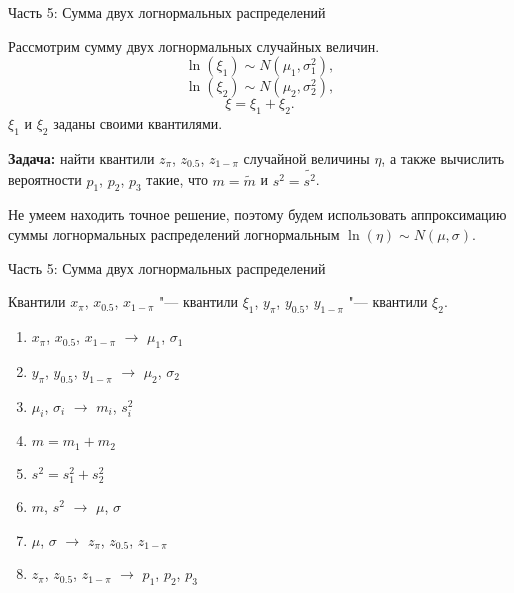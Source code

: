 \documentclass[ucs, notheorems, handout]{beamer}
\newenvironment{pr1}{\par\noindent{\bf Дано:}}{}
\begin{document}
\begin{frame}{Часть 5: Сумма двух логнормальных распределений }
	
		Рассмотрим сумму двух логнормальных случайных величин.
	\begin{equation*}
		\ln(\xi_{1}) \sim N(\mu_{1}, \sigma _{1}^{2}),
	\end{equation*}
	\begin{equation*}
		\ln(\xi_{2}) \sim N(\mu_{2}, \sigma _{2}^{2}),
	\end{equation*}
	\begin{equation*}
		\xi = \xi_{1}+\xi_{2}.
	\end{equation*}
	$\xi_{1}$ и $\xi_{2}$ заданы своими квантилями.
	\bigskip
	
	\textbf{Задача:} найти квантили $z_{\pi}$, $z_{0.5}$, $z_{1-\pi}$ случайной величины $\eta$, а также вычислить вероятности $p_{1}$, $p_{2}$, $p_{3}$ такие, что $m = \tilde{m}$  и $s^{2} = \tilde{s^{2}}$.
	
	\bigskip
	
	Не умеем находить точное решение, поэтому будем использовать аппроксимацию суммы логнормальных распределений логнормальным $\ln(\eta)\sim N(\mu, \sigma)$.

	
\end{frame}

\begin{frame}{Часть 5: Сумма двух логнормальных распределений}
	
	\begin{pr1}
		Квантили $x_{\pi}$, $x_{0.5}$, $x_{1-\pi}$ "--- квантили $\xi_{1}$, $y_{\pi}$, $y_{0.5}$, $y_{1-\pi}$ "--- квантили $\xi_{2}$.
	\end{pr1}
	\begin{enumerate}
		\item $x_{\pi}$, $x_{0.5}$, $x_{1-\pi}$ $\rightarrow$  $\mu_{1}$, $\sigma_{1}$
		\item $y_{\pi}$, $y_{0.5}$, $y_{1-\pi}$ $\rightarrow$ $\mu_{2}$, $\sigma_{2}$
		\item $\mu_{i}$, $\sigma_{i}$ $\rightarrow$ $m_{i}$, $s_{i}^{2}$
		\item $m = m_{1}+m_{2}$
		\item $s^{2}=s_{1}^{2} + s_{2}^{2}$
		\item $m$, $s^{2}$ $\rightarrow$ $\mu$, $\sigma$
		\item $\mu$, $\sigma$ $\rightarrow$ $z_{\pi}$, $z_{0.5}$, $z_{1-\pi}$
		\item $z_{\pi}$, $z_{0.5}$, $z_{1-\pi}$ $\rightarrow$ $p_{1}$, $p_{2}$, $p_{3}$
		
	\end{enumerate}
	
\end{frame}
	
\end{document}
